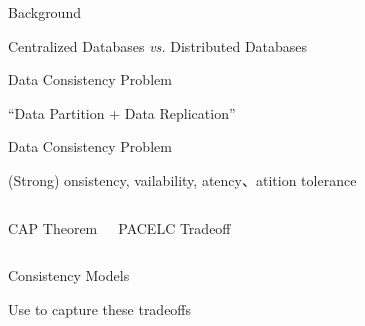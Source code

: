 
\begin{frame}{Background}
	\begin{center}
		Centralized Databases \emph{vs.} Distributed Databases


	\end{center}
\end{frame}

\begin{frame}{Data Consistency Problem}
	\begin{center}
		``Data Partition + Data Replication''
	\end{center}
\end{frame}

\begin{frame}{Data Consistency Problem}
	\begin{center}
		(Strong) \underline{}onsistency, \underline{}vailability,
		\underline{}atency、\underline{}atition tolerance
	\end{center}
	\begin{columns}[c]
		\begin{center}
			{CAP Theorem}%
		\end{center}
		\begin{center}

			\vspace{0.50cm}
			{PACELC Tradeoff}
		\end{center}
	\end{columns}
\end{frame}

\begin{frame}{Consistency Models}
	\begin{center}
		Use  to capture these tradeoffs
	\end{center}

	\begin{columns}[c]
	\end{columns}
\end{frame}

